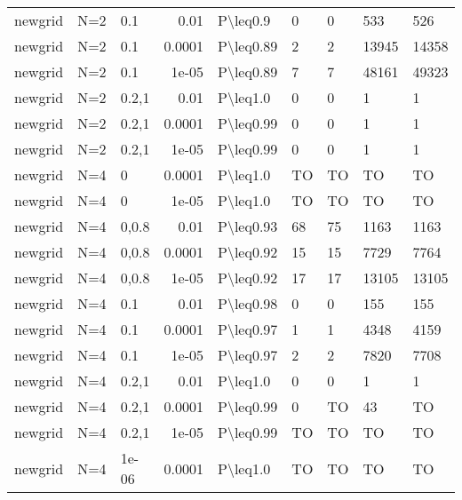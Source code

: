 \begin{longtable}{lllrlllll}
 newgrid       & N=2       & 0.1   & 0.01   & P\textbackslash{}leq0.9   & 0    & 0    & 533      & 526     \\
 newgrid       & N=2       & 0.1   & 0.0001 & P\textbackslash{}leq0.89  & 2    & 2    & 13945    & 14358   \\
 newgrid       & N=2       & 0.1   & 1e-05  & P\textbackslash{}leq0.89  & 7    & 7    & 48161    & 49323   \\
 newgrid       & N=2       & 0.2,1 & 0.01   & P\textbackslash{}leq1.0   & 0    & 0    & 1        & 1       \\
 newgrid       & N=2       & 0.2,1 & 0.0001 & P\textbackslash{}leq0.99  & 0    & 0    & 1        & 1       \\
 newgrid       & N=2       & 0.2,1 & 1e-05  & P\textbackslash{}leq0.99  & 0    & 0    & 1        & 1       \\
 newgrid       & N=4       & 0     & 0.0001 & P\textbackslash{}leq1.0   & TO   & TO   & TO       & TO      \\
 newgrid       & N=4       & 0     & 1e-05  & P\textbackslash{}leq1.0   & TO   & TO   & TO       & TO      \\
 newgrid       & N=4       & 0,0.8 & 0.01   & P\textbackslash{}leq0.93  & 68   & 75   & 1163     & 1163    \\
 newgrid       & N=4       & 0,0.8 & 0.0001 & P\textbackslash{}leq0.92  & 15   & 15   & 7729     & 7764    \\
 newgrid       & N=4       & 0,0.8 & 1e-05  & P\textbackslash{}leq0.92  & 17   & 17   & 13105    & 13105   \\
 newgrid       & N=4       & 0.1   & 0.01   & P\textbackslash{}leq0.98  & 0    & 0    & 155      & 155     \\
 newgrid       & N=4       & 0.1   & 0.0001 & P\textbackslash{}leq0.97  & 1    & 1    & 4348     & 4159    \\
 newgrid       & N=4       & 0.1   & 1e-05  & P\textbackslash{}leq0.97  & 2    & 2    & 7820     & 7708    \\
 newgrid       & N=4       & 0.2,1 & 0.01   & P\textbackslash{}leq1.0   & 0    & 0    & 1        & 1       \\
 newgrid       & N=4       & 0.2,1 & 0.0001 & P\textbackslash{}leq0.99  & 0    & TO   & 43       & TO      \\
 newgrid       & N=4       & 0.2,1 & 1e-05  & P\textbackslash{}leq0.99  & TO   & TO   & TO       & TO      \\
 newgrid       & N=4       & 1e-06 & 0.0001 & P\textbackslash{}leq1.0   & TO   & TO   & TO       & TO      \\

\end{longtable}
